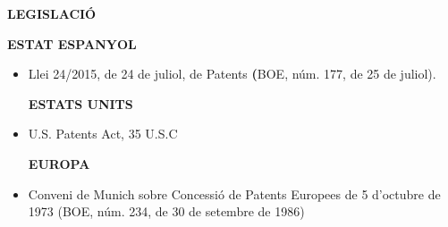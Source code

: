 \documentclass[12pt]{article}
\renewcommand{\_}{\kern-1.5pt\textunderscore\kern-1.5pt}
\begin{document}
\begin{itemize}
\vspace{\baselineskip}

\vspace{\baselineskip}

\vspace{\baselineskip}

\vspace{\baselineskip}

\vspace{\baselineskip}

\vspace{\baselineskip}

\vspace{\baselineskip}
\begin{Center}
{\fontsize{16pt}{19.2pt}\selectfont \textbf{LEGISLACIÓ}\par}
\end{Center}\par


\vspace{\baselineskip}

\vspace{\baselineskip}

\vspace{\baselineskip}
\begin{justify}
\textbf{ESTAT ESPANYOL}
\end{justify}\par


\vspace{\baselineskip}
\begin{itemize}
	\item Llei 24/2015, de 24 de juliol, de Patents\textbf{ (}BOE, núm. 177, de 25 de juliol).\par


\vspace{\baselineskip}
\textbf{ESTATS UNITS}\par


\vspace{\baselineskip}
	\item U.S. Patents Act, 35 U.S.C \par


\vspace{\baselineskip}
\textbf{EUROPA}\par


\vspace{\baselineskip}
	\item Conveni de Munich sobre Concessió de Patents Europees de 5 d’octubre de 1973 (BOE, núm. 234, de 30 de setembre de 1986)\par



\end{itemize}
\end{itemize}
\end{document}
